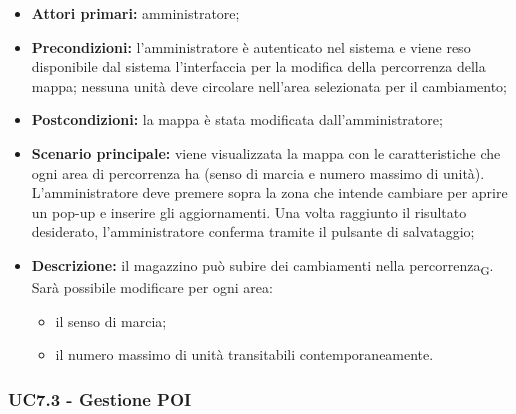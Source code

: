 \begin{itemize}

  \item   \textbf{Attori primari:} amministratore;

  \item   \textbf{Precondizioni:}  l'amministratore è autenticato nel sistema e viene reso disponibile dal sistema l'interfaccia per la modifica della percorrenza della mappa; nessuna unità deve circolare nell'area selezionata per il cambiamento;

  \item   \textbf{Postcondizioni:} la mappa è stata modificata dall'amministratore;
 \item   \textbf{Scenario principale:} viene visualizzata la mappa con le caratteristiche che ogni area di percorrenza ha (senso di marcia e numero massimo di unità). L'amministratore deve premere sopra la zona che intende cambiare per aprire un pop-up e inserire gli aggiornamenti. Una volta raggiunto il risultato desiderato, l'amministratore conferma tramite il pulsante di salvataggio;

  \item   \textbf{Descrizione:} il magazzino può subire dei cambiamenti nella percorrenza\textsubscript{G}. Sarà possibile modificare per ogni area:

  \begin{itemize}

     \item il senso di marcia;

   \item il numero massimo di unità transitabili contemporaneamente.

 \end{itemize}

\end{itemize}



\subsubsection{UC7.3 - Gestione POI}



